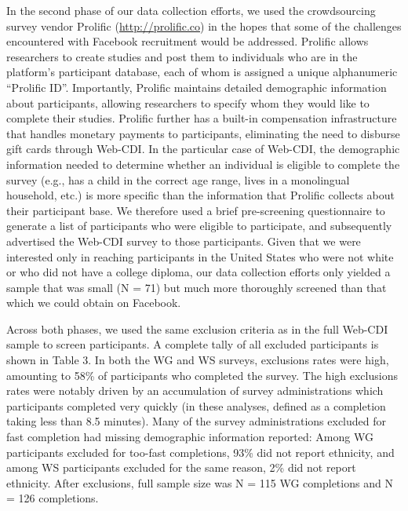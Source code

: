 \documentclass[
  english,
  man]{apa7}
\begin{document}
In the second phase of our data collection efforts, we used the crowdsourcing survey vendor Prolific (\url{http://prolific.co}) in the hopes that some of the challenges encountered with Facebook recruitment would be addressed. Prolific allows researchers to create studies and post them to individuals who are in the platform's participant database, each of whom is assigned a unique alphanumeric \enquote{Prolific ID}. Importantly, Prolific maintains detailed demographic information about participants, allowing researchers to specify whom they would like to complete their studies. Prolific further has a built-in compensation infrastructure that handles monetary payments to participants, eliminating the need to disburse gift cards through Web-CDI. In the particular case of Web-CDI, the demographic information needed to determine whether an individual is eligible to complete the survey (e.g., has a child in the correct age range, lives in a monolingual household, etc.) is more specific than the information that Prolific collects about their participant base. We therefore used a brief pre-screening questionnaire to generate a list of participants who were eligible to participate, and subsequently advertised the Web-CDI survey to those participants. Given that we were interested only in reaching participants in the United States who were not white or who did not have a college diploma, our data collection efforts only yielded a sample that was small (N = 71) but much more thoroughly screened than that which we could obtain on Facebook.

Across both phases, we used the same exclusion criteria as in the full Web-CDI sample to screen participants. A complete tally of all excluded participants is shown in Table 3. In both the WG and WS surveys, exclusions rates were high, amounting to 58\% of participants who completed the survey. The high exclusions rates were notably driven by an accumulation of survey administrations which participants completed very quickly (in these analyses, defined as a completion taking less than 8.5 minutes). Many of the survey administrations excluded for fast completion had missing demographic information reported: Among WG participants excluded for too-fast completions, 93\% did not report ethnicity, and among WS participants excluded for the same reason, 2\% did not report ethnicity. After exclusions, full sample size was N = 115 WG completions and N = 126 completions.
\end{document}
